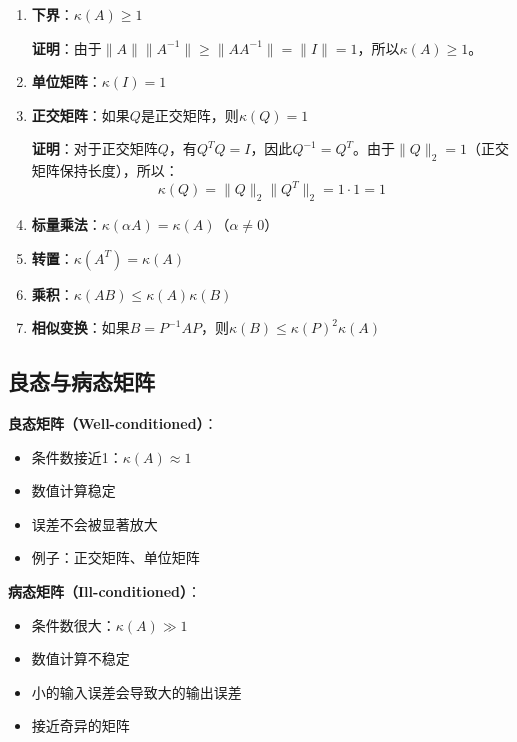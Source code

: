 \documentclass[12pt,a4paper]{article}
\begin{document}
\begin{enumerate}
\item \textbf{下界}：$\kappa(A) \geq 1$

\textbf{证明}：由于$\|A\| \|A^{-1}\| \geq \|A A^{-1}\| = \|I\| = 1$，所以$\kappa(A) \geq 1$。

\item \textbf{单位矩阵}：$\kappa(I) = 1$

\item \textbf{正交矩阵}：如果$Q$是正交矩阵，则$\kappa(Q) = 1$

\textbf{证明}：对于正交矩阵$Q$，有$Q^T Q = I$，因此$Q^{-1} = Q^T$。由于$\|Q\|_2 = 1$（正交矩阵保持长度），所以：
\begin{equation}
\kappa(Q) = \|Q\|_2 \|Q^T\|_2 = 1 \cdot 1 = 1
\end{equation}

\item \textbf{标量乘法}：$\kappa(\alpha A) = \kappa(A)$（$\alpha \neq 0$）

\item \textbf{转置}：$\kappa(A^T) = \kappa(A)$

\item \textbf{乘积}：$\kappa(AB) \leq \kappa(A) \kappa(B)$

\item \textbf{相似变换}：如果$B = P^{-1}AP$，则$\kappa(B) \leq \kappa(P)^2 \kappa(A)$
\end{enumerate}

\subsection{良态与病态矩阵}

\textbf{良态矩阵（Well-conditioned）}：
\begin{itemize}
\item 条件数接近1：$\kappa(A) \approx 1$
\item 数值计算稳定
\item 误差不会被显著放大
\item 例子：正交矩阵、单位矩阵
\end{itemize}

\textbf{病态矩阵（Ill-conditioned）}：
\begin{itemize}
\item 条件数很大：$\kappa(A) \gg 1$
\item 数值计算不稳定
\item 小的输入误差会导致大的输出误差
\item 接近奇异的矩阵
\end{itemize}
\end{document}
